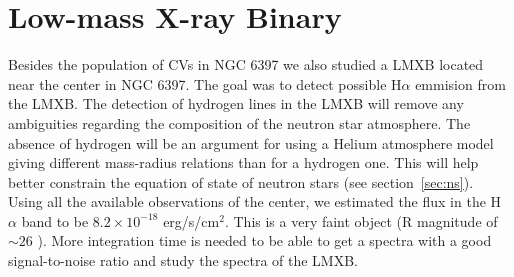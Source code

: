 \section{Low-mass X-ray Binary}


Besides the population of CVs in NGC 6397 we also studied a LMXB located near the center in NGC 6397. The goal was to detect possible H$\alpha$ emmision from the LMXB. The detection of hydrogen lines in the LMXB  will remove any ambiguities regarding the composition of the neutron star atmosphere. The absence of hydrogen  will be an argument for using a Helium atmosphere model giving different mass-radius relations than for a hydrogen one. This will help better constrain the equation of state of neutron stars (see section~\ref{sec:ns}). Using all the available observations of the center, we estimated the flux in the H $\alpha$ band to be $8.2 \times 10^{-18}$ erg/s/cm$^2$. This is a very faint object (R magnitude of $\sim 26$ \citep{heinke_improved_2014}). More integration time is needed to be able to get a spectra with a good signal-to-noise ratio and study the spectra of the LMXB. 

